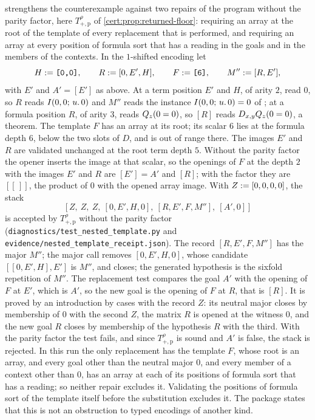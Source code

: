  strengthens the counterexample against two repairs of the
program without the parity factor, here $T^{\rho}_{+,\mathrm p}$ of
\cref{cert:prop:returned-floor}: requiring an array at the root of the template of
every replacement that is performed, and requiring an array at every position of
formula sort that has a reading in the goals and in the members of the contexts. In the $1$-shifted encoding let
\[
H\mathrel{:=}\texttt{[0,0]},\qquad R\mathrel{:=}[0,E',H],\qquad F\mathrel{:=}\texttt{[6]},\qquad
M''\mathrel{:=}[R,E'],
\]
with $E'$ and $A'=[E']$ as above. At a term position $E'$ and $H$, of arity $2$,
read $0$, so $R$ reads $I(0,0;\,u.\,0)$ and $M''$ reads the instance
$I(0,0;\,u.\,0)=0$ of ; at a formula position $R$, of arity $3$,
reads $Q_{z}(0=0)$, so $[R]$ reads $D_{x,y}Q_{z}(0=0)$, a theorem. The template $F$
has an array at its root; its scalar $6$ lies at the formula depth $6$, below the
two slots of $D$, and is out of range there. The images $E'$ and $R$ are validated
unchanged at the root term depth $5$. Without the parity factor the opener inserts
the image at that scalar, so the openings of $F$ at the depth $2$ with the images
$E'$ and $R$ are $[E']=A'$ and $[R]$; with the factor they are $[[\,]]$, the
product of $0$ with the opened array image. With $Z\mathrel{:=}[0,0,0,0]$, the
stack
\[
\bigl[\,Z,\ Z,\ Z,\ [0,E',H,0],\ [R,E',F,M''],\ [A',0]\,\bigr]
\]
is accepted by $T^{\rho}_{+,\mathrm p}$ without the parity factor
(\texttt{diagnostics/test\_nested\_template.py} and
\texttt{evidence/nested\_template\_receipt.json}). The record $[R,E',F,M'']$ has the
major $M''$; the major call removes $[0,E',H,0]$, whose candidate $[[0,E',H],E']$ is
$M''$, and closes; the generated hypothesis is the sixfold repetition of $M''$. The
replacement test compares the goal $A'$ with the opening of $F$ at $E'$, which is
$A'$, so the new goal is the opening of $F$ at $R$, that is $[R]$. It is proved by an
introduction by cases with the record $Z$: its neutral major closes by membership of
$0$ with the second $Z$, the matrix $R$ is opened at the witness $0$, and the new
goal $R$ closes by membership of the hypothesis $R$ with the third. With the
parity factor the test fails, and since $T^{\rho}_{+,\mathrm p}$ is sound and $A'$
is false, the stack is rejected. In this run the only replacement has the template
$F$, whose root is an array, and every goal other than the neutral major $0$, and
every member of a
context other than $0$, has an array at each of its positions of formula sort that
has a reading; so neither repair excludes it. Validating the positions of formula
sort of the template itself before the substitution excludes it. The package states
that this is not an obstruction to typed encodings of another kind.

